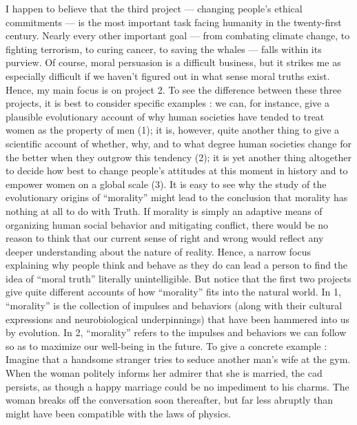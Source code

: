 \documentclass[a4paper,14pt]{extbook}
\begin{document}
I happen to believe that the third project --- changing people's ethical commitments --- is the most important task facing humanity in the twenty-first century.
Nearly every other important goal --- from combating climate change, to fighting terrorism, to curing cancer, to saving the whales --- falls within its purview.
Of course, moral persuasion is a difficult business, but it strikes me as especially difficult if we haven't figured out in what sense moral truths exist.
Hence, my main focus is on project 2.
To see the difference between these three projects, it is best to consider specific examples :
we can, for instance, give a plausible evolutionary account of why human societies have tended to treat women as the property of men (1);
it is, however, quite another thing to give a scientific account of whether, why, and to what degree human societies change for the better when they outgrow this tendency (2);
it is yet another thing altogether to decide how best to change people's attitudes at this moment in history and to empower women on a global scale (3).
It is easy to see why the study of the evolutionary origins of ``morality'' might lead to the conclusion that morality has nothing at all to do with Truth.
If morality is simply an adaptive means of organizing human social behavior and mitigating conflict, there would be no reason to think that our current sense of right and wrong would reflect any deeper understanding about the nature of reality.
Hence, a narrow focus explaining why people think and behave as they do can lead a person to find the idea of ``moral truth'' literally unintelligible.
But notice that the first two projects give quite different accounts of how ``morality'' fits into the natural world.
In 1, ``morality'' is the collection of impulses and behaviors (along with their cultural expressions and neurobiological underpinnings) that have been hammered into us by evolution.
In 2, ``morality'' refers to the impulses and behaviors we can follow so as to maximize our well-being in the future.
To give a concrete example :
Imagine that a handsome stranger tries to seduce another man's wife at the gym.
When the woman politely informs her admirer that she is married, the cad persists, as though a happy marriage could be no impediment to his charms.
The woman breaks off the conversation soon thereafter, but far less abruptly than might have been compatible with the laws of physics.
\end{document}
